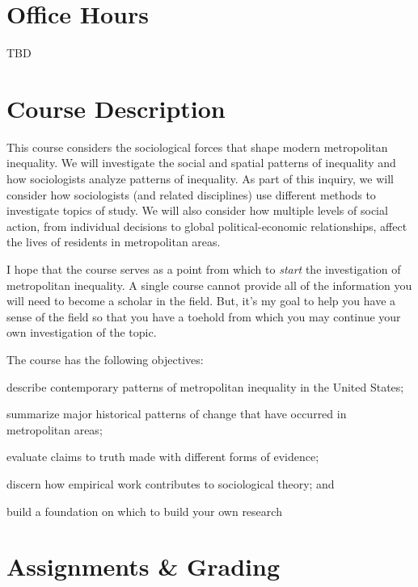 \documentclass[11pt]{syllabus}
\newcommand{\officehourtimes}{TBD}
\begin{document}
\maketitle 

\section{Office Hours}
\officehourtimes

\section{Course Description}
This course considers the sociological forces that shape modern metropolitan inequality. We will investigate the social and spatial patterns of inequality and how sociologists analyze patterns of inequality. As part of this inquiry, we will consider how sociologists (and related disciplines) use different methods to investigate topics of study. We will also consider how multiple levels of social action, from individual decisions to global political-economic relationships, affect the lives of residents in metropolitan areas.  

I hope that the course serves as a point from which to \emph{start} the investigation of metropolitan inequality. A single course cannot provide all of the information you will need to become a scholar in the field. But, it's my goal to help you have a sense of the field so that you have a toehold from which you may continue your own investigation of the topic. 

The course has the following objectives: 

\begin{objectives}
\item describe contemporary patterns of metropolitan inequality in the United States;
\item summarize major historical patterns of change that have occurred in metropolitan areas;
\item evaluate claims to truth made with different forms of evidence; 
\item discern how empirical work contributes to sociological theory; and
\item build a foundation on which to build your own research
\end{objectives}

\section{Assignments \& Grading}
\end{document}
